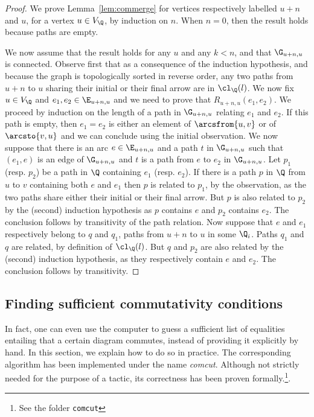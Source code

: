 \begin{proof}
  We prove Lemma~\ref{lem:commerge} for vertices respectively labelled $u + n$ and $u$, for a vertex $u \in V_\Q$, by induction on $n$. When $n = 0$, then the result holds because paths are empty.

  We now assume that the result holds for any $u$ and any $k < n$, and that $\G_{u+n,u}$ is connected. Observe first that as a consequence of the induction hypothesis, and because the graph is  topologically sorted in reverse order, any two paths from $u + n$ to $u$ sharing their initial or their final arrow are in $\cl_\Q(l)$. We now fix $u\in V_\Q$ and $e_1, e_2 \in \E_{u+n,u}$ and we need to prove that $R_{u+n,u}(e_1, e_2)$. We proceed by induction on the length of a path in $\G_{u+n,u}$ relating $e_1$ and $e_2$. If this path is empty, then $e_1 = e_2$ is either an element of $\arcsfrom{u,v}$ or of $\arcsto{v,u}$ and we can conclude using the initial observation. We now suppose that there is an arc $e\in \E_{u+n,u}$ and a path $t$ in $\G_{u+n,u}$ such that $(e_1, e)$ is an edge of $\G_{u+n,u}$ and $t$ is a path from $e$ to $e_2$ in $\G_{u+n,u}$. Let $p_1$ (resp. $p_2$) be a path in $\Q$ containing $e_1$  (resp. $e_2$). If there is a path $p$ in $\Q$ from $u$ to $v$ containing both $e$ and $e_1$ then $p$ is related to $p_1$, by the observation, as the two paths share either their initial or their final arrow. But $p$ is also related to $p_2$ by the (second) induction hypothesis as $p$ contains $e$ and $p_2$ contains $e_2$. The conclusion follows by transitivity of the path relation. Now suppose that $e$ and $e_1$ respectively belong to $q$ and $q_1$, paths from $u+n$ to $u$ in some $\Q_i$. Paths $q_1$ and $q$ are related, by definition of $\cl_\Q(l)$. But $q$ and $p_2$ are also related by the (second) induction hypothesis, as they respectively contain $e$ and $e_2$. The conclusion follows by transitivity.
\end{proof}



\subsection{Finding sufficient commutativity conditions}\label{ssec:comcut}

In fact, one can even use the computer to guess a sufficient list of equalities entailing that a certain diagram commutes, instead of providing it explicitly by hand. In this section, we explain how to do so in practice. The corresponding algorithm has been implemented under the name \emph{comcut}. Although not strictly needed for the purpose of a tactic, its correctness has been proven formally.\footnote{See the folder \texttt{comcut}}.

